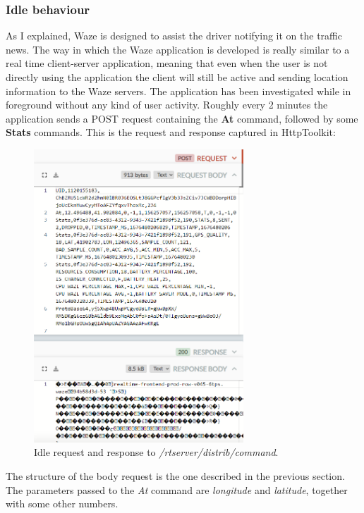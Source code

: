 		\subsubsection{Idle behaviour}
			\par As I explained, Waze is designed to assist the driver notifying it on the traffic news. The way in which the Waze application is developed is really similar to a real time client-server application, meaning that even when the user is not directly using the application the client will still be active and sending location information to the Waze servers. \newline
			The application has been investigated while in foreground without any kind of user activity. Roughly every 2 minutes the application sends a POST request containing the \textbf{At} command, followed by some \textbf{Stats} commands. This is the request and response captured in HttpToolkit:
			\begin{figure}[H]
				\centering
				\includegraphics[width=0.7\textwidth]{images/waze_idle.png}
				\caption{Idle request and response to \textit{/rtserver/distrib/command}.}
			\end{figure}
			The structure of the body request is the one described in the previous section.\newline
			The parameters passed to the \textit{At} command are \textit{longitude} and \textit{latitude}, together with some other numbers.\newline
